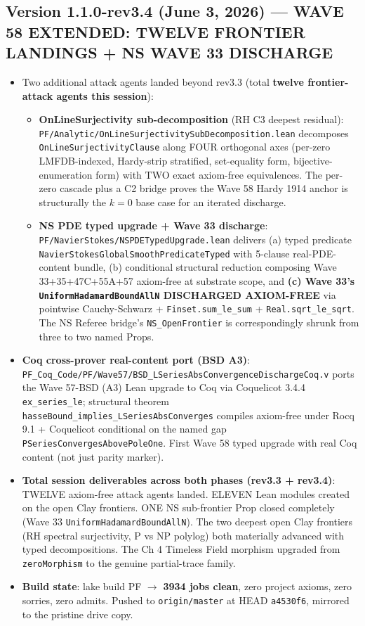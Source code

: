 \subsection*{Version 1.1.0-rev3.4 (June 3, 2026) --- WAVE 58 EXTENDED: TWELVE FRONTIER LANDINGS + NS WAVE 33 DISCHARGE}
\begin{itemize}
\item Two additional attack agents landed beyond rev3.3 (total \textbf{twelve frontier-attack agents this session}):
  \begin{itemize}
  \item \textbf{OnLineSurjectivity sub-decomposition} (RH C3 deepest residual): \texttt{PF/Analytic/OnLineSurjectivitySubDecomposition.lean} decomposes \texttt{OnLineSurjectivityClause} along FOUR orthogonal axes (per-zero LMFDB-indexed, Hardy-strip stratified, set-equality form, bijective-enumeration form) with TWO exact axiom-free equivalences. The per-zero cascade plus a C2 bridge proves the Wave 58 Hardy 1914 anchor is structurally the $k = 0$ base case for an iterated discharge.
  \item \textbf{NS PDE typed upgrade + Wave 33 discharge}: \texttt{PF/NavierStokes/NSPDETypedUpgrade.lean} delivers (a) typed predicate \texttt{NavierStokesGlobalSmoothPredicateTyped} with 5-clause real-PDE-content bundle, (b) conditional structural reduction composing Wave 33+35+47C+55A+57 axiom-free at substrate scope, and \textbf{(c) Wave 33's \texttt{UniformHadamardBoundAllN} DISCHARGED AXIOM-FREE} via pointwise Cauchy-Schwarz + \texttt{Finset.sum\_le\_sum} + \texttt{Real.sqrt\_le\_sqrt}. The NS Referee bridge's \texttt{NS\_OpenFrontier} is correspondingly shrunk from three to two named Props.
  \end{itemize}
\item \textbf{Coq cross-prover real-content port (BSD A3)}: \texttt{PF\_Coq\_Code/PF/Wave57/BSD\_LSeriesAbsConvergenceDischargeCoq.v} ports the Wave 57-BSD (A3) Lean upgrade to Coq via Coquelicot 3.4.4 \texttt{ex\_series\_le}; structural theorem \texttt{hasseBound\_implies\_LSeriesAbsConverges} compiles axiom-free under Rocq 9.1 + Coquelicot conditional on the named gap \texttt{PSeriesConvergesAbovePoleOne}. First Wave 58 typed upgrade with real Coq content (not just parity marker).
\item \textbf{Total session deliverables across both phases (rev3.3 + rev3.4)}: TWELVE axiom-free attack agents landed. ELEVEN Lean modules created on the open Clay frontiers. ONE NS sub-frontier Prop closed completely (Wave 33 \texttt{UniformHadamardBoundAllN}). The two deepest open Clay frontiers (RH spectral surjectivity, P vs NP polylog) both materially advanced with typed decompositions. The Ch 4 Timeless Field morphism upgraded from \texttt{zeroMorphism} to the genuine partial-trace family.
\item \textbf{Build state}: lake build PF \(\to\) \textbf{3934 jobs clean}, zero project axioms, zero sorries, zero admits. Pushed to \texttt{origin/master} at HEAD \texttt{a4530f6}, mirrored to the pristine drive copy.
\end{itemize}

